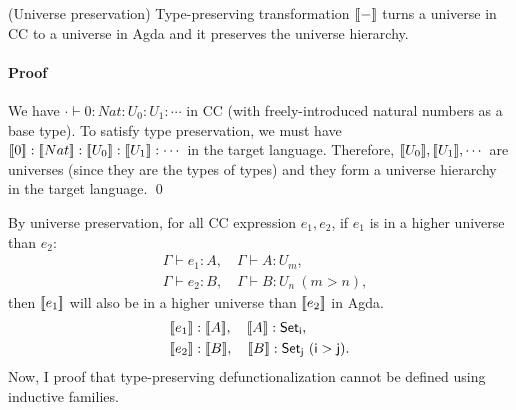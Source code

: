 \begin{lemma} (Universe preservation) Type-preserving transformation ${[\![ - ]\!]}$ turns a universe in CC to a universe in Agda and it preserves the universe hierarchy. 
\paragraph{Proof} 
We have $\cdot \vdash 0 : Nat : U_0 : U_1 : \cdots$ in CC (with freely-introduced natural numbers as a base type). To satisfy type preservation, we must have $\bbracket{0} : \bbracket{Nat} : \bbracket{U_0}: \bbracket{U_1} : \cdots$ in the target language. 
Therefore, ${[\![ U_0 ]\!]}, {[\![ U_1 ]\!]}, \cdots$ are universes (since they are the types of types) and they form a universe hierarchy in the target language. \qed
\label{lemma : universe}
\end{lemma}
By universe preservation, for all CC expression $e_1, e_2$, if $e_1$ is in a higher universe than $e_2$:
\begin{align*}
  & \Gamma \vdash e_1 : A, \quad \Gamma \vdash A : U_m, \\
  & \Gamma \vdash e_2 : B, \quad \Gamma \vdash B : U_n \ (m > n),
\end{align*}
then ${[\![ e_1 ]\!]}$ will also be in a higher universe than ${[\![ e_2 ]\!]}$ in Agda.
\begin{align*}
  & \bbracket{e_1} : \bbracket{A}, \quad \bbracket{A} : \mathsf{Set_i},\\
  & \bbracket{e_2} : \bbracket{B}, \quad \bbracket{B} : \mathsf{Set_j}\ (\mathsf{i > j}).
\end{align*}
Now, I proof that type-preserving defunctionalization cannot be defined using inductive families.

